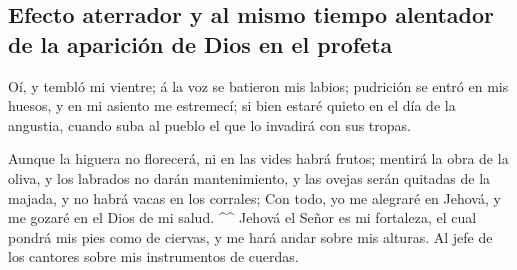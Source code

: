 \hypertarget{efecto-aterrador-y-al-mismo-tiempo-alentador-de-la-apariciuxf3n-de-dios-en-el-profeta}{%
\subsection{Efecto aterrador y al mismo tiempo alentador de la aparición
de Dios en el
profeta}\label{efecto-aterrador-y-al-mismo-tiempo-alentador-de-la-apariciuxf3n-de-dios-en-el-profeta}}

 Oí, y tembló mi vientre; á la voz se batieron mis labios;
pudrición se entró en mis huesos, y en mi asiento me estremecí; si bien
estaré quieto en el día de la angustia, cuando suba al pueblo el que lo
invadirá con sus tropas.

 Aunque la higuera no florecerá, ni en las vides habrá
frutos; mentirá la obra de la oliva, y los labrados no darán
mantenimiento, y las ovejas serán quitadas de la majada, y no habrá
vacas en los corrales;  Con todo, yo me alegraré en Jehová,
y me gozaré en el Dios de mi salud. \^{}\^{}  Jehová el
Señor es mi fortaleza, el cual pondrá mis pies como de ciervas, y me
hará andar sobre mis alturas. Al jefe de los cantores sobre mis
instrumentos de cuerdas.
